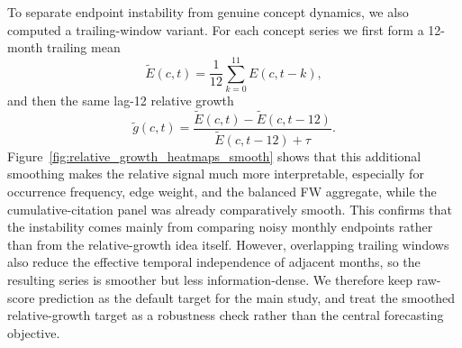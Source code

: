 \documentclass{article}
\begin{document}
To separate endpoint instability from genuine concept dynamics, we also computed a trailing-window variant. For each concept series we first form a 12-month trailing mean
\[
\tilde{E}(c,t)=\frac{1}{12}\sum_{k=0}^{11}E(c,t-k),
\]
and then the same lag-12 relative growth
\[
\tilde{g}(c,t)=\frac{\tilde{E}(c,t)-\tilde{E}(c,t-12)}{\tilde{E}(c,t-12)+\tau}.
\]
Figure~\ref{fig:relative_growth_heatmaps_smooth} shows that this additional smoothing makes the relative signal much more interpretable, especially for occurrence frequency, edge weight, and the balanced FW aggregate, while the cumulative-citation panel was already comparatively smooth. This confirms that the instability comes mainly from comparing noisy monthly endpoints rather than from the relative-growth idea itself. However, overlapping trailing windows also reduce the effective temporal independence of adjacent months, so the resulting series is smoother but less information-dense. We therefore keep raw-score prediction as the default target for the main study, and treat the smoothed relative-growth target as a robustness check rather than the central forecasting objective.
\end{document}
